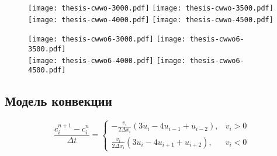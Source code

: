 \begin{figure}
    \texttt{[image: thesis-cwwo-3000.pdf]}\hfill
    \texttt{[image: thesis-cwwo-3500.pdf]}\hfill
    \\[\smallskipamount]
    \texttt{[image: thesis-cwwo-4000.pdf]}\hfill
    \texttt{[image: thesis-cwwo-4500.pdf]}\hfill
\end{figure}
\begin{figure}
    \texttt{[image: thesis-cwwo6-3000.pdf]}\hfill
    \texttt{[image: thesis-cwwo6-3500.pdf]}\hfill
    \\[\smallskipamount]
    \texttt{[image: thesis-cwwo6-4000.pdf]}\hfill
    \texttt{[image: thesis-cwwo6-4500.pdf]}\hfill
\end{figure}

\subsection{Модель конвекции}

\begin{equation}
    \label{eq:sec-upwind}
    \frac{c^{n+1}_{i} - c^{n}_{i}}{\Delta t} =
    \begin{cases}
         -\frac{v_i}{2\Delta x_i}(3u_i-4u_{i-1}+u_{i-2}), &v_i > 0 \\
         \frac{v_i}{2\Delta x_i}(3u_i-4u_{i+1}+u_{i+2}), &v_i < 0 
    \end{cases}
\end{equation}

\clearpage